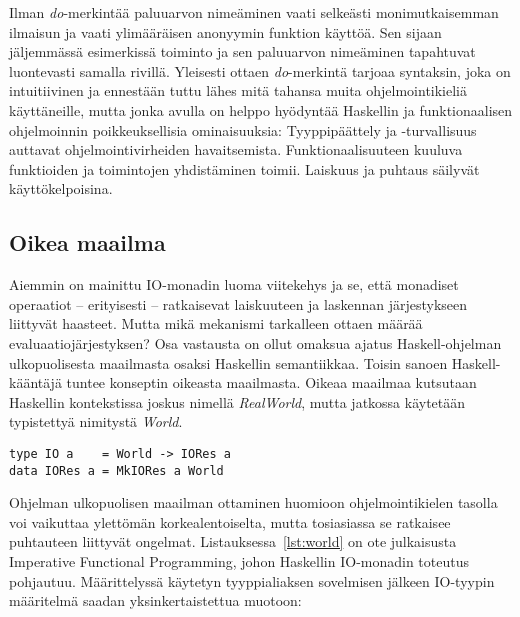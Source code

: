 \documentclass[finnish]{tktltiki2}
\begin{document}

Ilman \emph{do}-merkintää paluuarvon nimeäminen vaati selkeästi monimutkaisemman ilmaisun ja vaati
ylimääräisen anonyymin funktion käyttöä. Sen sijaan jäljemmässä esimerkissä toiminto ja sen
paluuarvon nimeäminen tapahtuvat luontevasti samalla rivillä. Yleisesti ottaen \emph{do}-merkintä
tarjoaa syntaksin, joka on intuitiivinen ja ennestään tuttu lähes mitä tahansa muita
ohjelmointikieliä käyttäneille, mutta jonka avulla on helppo hyödyntää Haskellin ja funktionaalisen
ohjelmoinnin poikkeuksellisia ominaisuuksia: 
Tyyppipäättely ja -turvallisuus auttavat ohjelmointivirheiden havaitsemista. Funktionaalisuuteen
kuuluva funktioiden ja toimintojen yhdistäminen toimii. Laiskuus ja puhtaus säilyvät
käyttökelpoisina.



\subsection{Oikea maailma}

Aiemmin on mainittu IO-monadin luoma viitekehys ja se, että monadiset operaatiot -- erityisesti
\code{(>>=)} -- ratkaisevat laiskuuteen ja laskennan järjestykseen liittyvät haasteet. Mutta mikä
mekanismi tarkalleen ottaen määrää evaluaatiojärjestyksen? Osa vastausta on ollut omaksua ajatus
Haskell-ohjelman ulkopuolisesta maailmasta osaksi Haskellin semantiikkaa. Toisin sanoen
Haskell-kääntäjä tuntee konseptin oikeasta maailmasta. Oikeaa maailmaa kutsutaan Haskellin
kontekstissa joskus nimellä \emph{RealWorld}, mutta jatkossa käytetään typistettyä nimitystä
\emph{World}.

\begin{lstlisting}[float,label={lst:world},caption={IFP, IO-tyyppi}]
type IO a    = World -> IORes a
data IORes a = MkIORes a World
\end{lstlisting}

Ohjelman ulkopuolisen maailman ottaminen huomioon ohjelmointikielen tasolla voi vaikuttaa ylettömän
korkealentoiselta, mutta tosiasiassa se ratkaisee puhtauteen liittyvät ongelmat.
Listauksessa~\ref{lst:world} on ote julkaisusta Imperative Functional Programming\cite{ifp93}, johon
Haskellin IO-monadin toteutus pohjautuu. Määrittelyssä käytetyn tyyppialiaksen sovelmisen jälkeen
IO-tyypin määritelmä saadan yksinkertaistettua muotoon:
\end{document}
